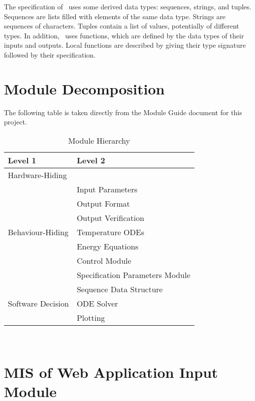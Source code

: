 \documentclass[12pt, titlepage]{article}
\begin{document}
\noindent
The specification of \progname \ uses some derived data types: sequences, strings, and
tuples. Sequences are lists filled with elements of the same data type. Strings
are sequences of characters. Tuples contain a list of values, potentially of
different types. In addition, \progname \ uses functions, which
are defined by the data types of their inputs and outputs. Local functions are
described by giving their type signature followed by their specification.

\section{Module Decomposition}

The following table is taken directly from the Module Guide document for this project.

\begin{table}[h!]
\centering
\begin{tabular}{p{} p{}}
\toprule
\textbf{Level 1} & \textbf{Level 2}\\
\midrule

{Hardware-Hiding} & ~ \\
\midrule

\multirow{7}{0.3\textwidth}{Behaviour-Hiding} & Input Parameters\\
& Output Format\\
& Output Verification\\
& Temperature ODEs\\
& Energy Equations\\ 
& Control Module\\
& Specification Parameters Module\\
\midrule

\multirow{3}{0.3\textwidth}{Software Decision} & {Sequence Data Structure}\\
& ODE Solver\\
& Plotting\\
\bottomrule

\end{tabular}
\caption{Module Hierarchy}
\label{TblMH}
\end{table}

\newpage
~\newpage

\section{MIS of Web Application Input Module} \label{mInput}
\end{document}
